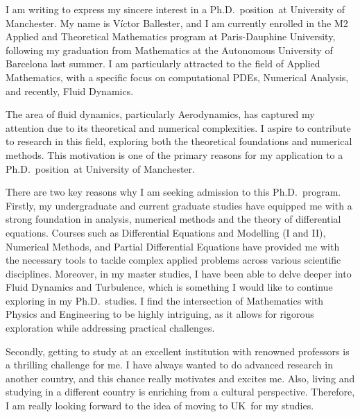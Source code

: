 \documentclass{letter}
\newcommand{\program}{Ph.D.\ position}
\newcommand{\uni}{University of Manchester}
\newcommand{\city}{UK}
\begin{document}
\begin{letter}




  I am writing to express my sincere interest in a \program\ at \uni. My name is Víctor Ballester, and I am currently enrolled in the M2 Applied and Theoretical Mathematics program at Paris-Dauphine University, following my graduation from Mathematics at the Autonomous University of Barcelona last summer. I am particularly attracted to the field of Applied Mathematics, with a specific focus on computational PDEs, Numerical Analysis, and recently, Fluid Dynamics.


  The area of fluid dynamics, particularly Aerodynamics, has captured my attention due to its theoretical and numerical complexities. I aspire to contribute to research in this field, exploring both the theoretical foundations and numerical methods. This motivation is one of the primary reasons for my application to a \program\ at \uni.


  There are two key reasons why I am seeking admission to this Ph.D.\ program. Firstly, my undergraduate and current graduate studies have equipped me with a strong foundation in analysis, numerical methods and the theory of differential equations. Courses such as Differential Equations and Modelling (I and II), Numerical Methods, and Partial Differential Equations have provided me with the necessary tools to tackle complex applied problems across various scientific disciplines. Moreover, in my master studies, I have been able to delve deeper into Fluid Dynamics and Turbulence, which is something I would like to continue exploring in my Ph.D.\ studies.
  I find the intersection of Mathematics with Physics and Engineering to be highly intriguing, as it allows for rigorous exploration while addressing practical challenges.

  Secondly, getting to study at an excellent institution with renowned professors is a thrilling challenge for me. I have always wanted to do advanced research in another country, and this chance really motivates and excites me. Also, living and studying in a different country is enriching from a cultural perspective. Therefore, I am really looking forward to the idea of moving to \city\ for my studies.


\end{letter}
\end{document}
